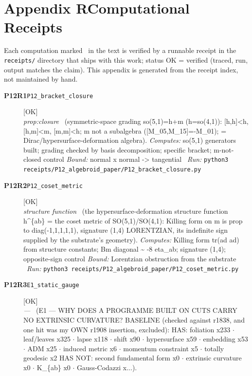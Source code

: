 \clearpage
\section*{Appendix R\quad Computational Receipts}\label{app:receipts}
\small\noindent Each computation marked \rcptmarker\ in the text is verified by a runnable receipt in the \texttt{receipts/} directory that ships with this work; status \textsf{OK} = verified (traced, run, output matches the claim). This appendix is generated from the receipt index, not maintained by hand.\par\medskip
\begingroup\renewcommand{\arraystretch}{1.25}
\begin{description}
\item[\textbf{P12R1}\quad\texttt{P12\_bracket\_closure}]\hfill\textsf{[OK]}\\
\textit{prop:closure} \ (symmetric-space grading so(5,1)=h+m (h=so(4,1)): [h,h]<h, [h,m]<m, [m,m]<h; m not a subalgebra ([M\_05,M\_15]=-M\_01); = Dirac/hypersurface-deformation algebra). 
\emph{Computes:} so(5,1) generators built; grading checked by basis decomposition; specific bracket; m-not-closed control
 \emph{Bound:} normal x normal -> tangential
\ \emph{Run:} \texttt{python3 receipts/P12\_algebroid\_paper/P12\_bracket\_closure.py}
\item[\textbf{P12R2}\quad\texttt{P12\_coset\_metric}]\hfill\textsf{[OK]}\\
\textit{structure function} \ (the hypersurface-deformation structure function h\textasciicircum{}\{ab\} = the coset metric of SO(5,1)/SO(4,1): Killing form on m is prop to diag(-1,1,1,1,1), signature (1,4) LORENTZIAN, its indefinite sign supplied by the substrate's geometry). 
\emph{Computes:} Killing form tr(ad ad) from structure constants; B\textbar{}m diagonal \textasciitilde{} -8 eta\_ab; signature (1,4); opposite-sign control
 \emph{Bound:} Lorentzian obstruction from the substrate
\ \emph{Run:} \texttt{python3 receipts/P12\_algebroid\_paper/P12\_coset\_metric.py}
\item[\textbf{P12R3}\quad\texttt{E1\_static\_gauge}]\hfill\textsf{[OK]}\\
\textit{---} \ (E1 --- WHY DOES A PROGRAMME BUILT ON CUTS CARRY NO EXTRINSIC CURVATURE? BASELINE (checked against r1838, and one hit was my OWN r1908 insertion, excluded): HAS: foliation x233 \ensuremath{\cdot} leaf/leaves x325 \ensuremath{\cdot} lapse x118 \ensuremath{\cdot} shift x90 \ensuremath{\cdot} hypersurface x59 \ensuremath{\cdot} embedding x53 \ensuremath{\cdot} ADM x25 \ensuremath{\cdot} induced metric x6 \ensuremath{\cdot} momentum constraint x5 \ensuremath{\cdot} totally geodesic x2 HAS NOT: second fundamental form x0 \ensuremath{\cdot} extrinsic curvature x0 \ensuremath{\cdot} K\_\{ab\} x0 \ensuremath{\cdot} Gauss-Codazzi x...). 

\end{description}
